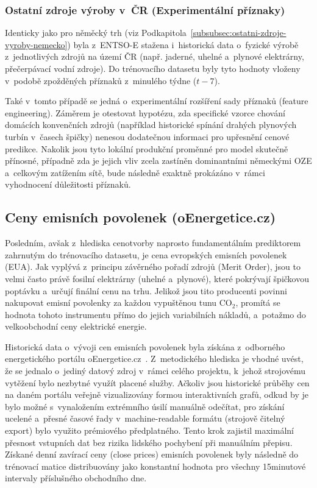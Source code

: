 \documentclass[a4paper]{article}
\begin{document}
\subsubsection{Ostatní zdroje výroby v~ČR (Experimentální příznaky)}
Identicky jako pro něměcký trh (viz Podkapitola~\ref{subsubsec:ostatni-zdroje-vyroby-nemecko}) byla z~ENTSO-E stažena i~historická data o~fyzické výrobě z~jednotlivých zdrojů na území ČR (např. jaderné, uhelné a~plynové elektrárny, přečerpávací vodní zdroje). Do trénovacího datasetu byly tyto hodnoty vloženy v~podobě zpožděných příznaků z~minulého týdne ($t-7$).

Také v~tomto případě se jedná o~experimentální rozšíření sady příznaků (feature engineering). Záměrem je otestovat hypotézu, zda specifické vzorce chování domácích konvenčních zdrojů (například historické spínání drahých plynových turbín v~časech špičky) nenesou dodatečnou informaci pro upřesnění cenové predikce. Nakolik jsou tyto lokální produkční proměnné pro model skutečně přínosné, případně zda je jejich vliv zcela zastíněn dominantními německými OZE a~celkovým zatížením sítě, bude následně exaktně prokázáno v~rámci vyhodnocení důležitosti příznaků. 

\subsection{Ceny emisních povolenek (oEnergetice.cz)}
Posledním, avšak z~hlediska cenotvorby naprosto fundamentálním prediktorem zahrnutým do trénovacího datasetu, je cena evropských emisních povolenek (EUA). Jak vyplývá z~principu závěrného pořadí zdrojů (Merit Order), jsou to velmi často právě fosilní elektrárny (uhelné a~plynové), které pokrývají špičkovou poptávku a~určují finální cenu na trhu. Jelikož jsou tito producenti povinni nakupovat emisní povolenky za každou vypuštěnou tunu CO$_2$, promítá se hodnota tohoto instrumentu přímo do jejich variabilních nákladů, a~potažmo do velkoobchodní ceny elektrické energie.

Historická data o~vývoji cen emisních povolenek byla získána z~odborného energetického portálu oEnergetice.cz~\cite{oenergetice}. Z~metodického hlediska je vhodné uvést, že se jednalo o~jediný datový zdroj v~rámci celého projektu, k~jehož strojovému vytěžení bylo nezbytné využít placené služby. Ačkoliv jsou historické průběhy cen na daném portálu veřejně vizualizovány formou interaktivních grafů, odkud by je bylo možné s~vynaložením extrémního úsilí manuálně odečítat, pro získání ucelené a~přesné časové řady v~machine-readable formátu (strojově čitelný export) bylo využito prémiového předplatného. Tento krok zajistil maximální přesnost vstupních dat bez rizika lidského pochybení při manuálním přepisu. Získané denní zavírací ceny (close prices) emisních povolenek byly následně do trénovací matice distribuovány jako konstantní hodnota pro všechny 15minutové intervaly příslušného obchodního dne.
\end{document}
